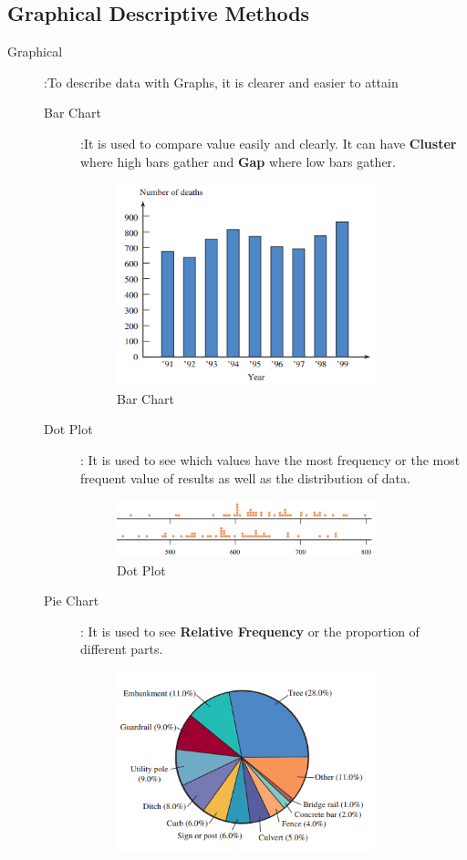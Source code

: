\subsection{Graphical Descriptive Methods}
\begin{description}
    
    \item[Graphical]:To describe data with Graphs, it is clearer and easier to attain 
    \begin{description}
        \item[Bar Chart]:It is used to compare value easily and clearly. It can have \textbf{Cluster} where high bars gather and \textbf{Gap} where low bars gather.
        \begin{figure}[H]
            \centering
            \includegraphics[width=75mm]{bar_chart.png}
            \caption{Bar Chart}
            \label{bar chart}
        \end{figure}
        \item[Dot Plot]: It is used to see which values have the most frequency or the most frequent value of results as well as the distribution of data.
        \begin{figure}[H]
            \centering
            \includegraphics[width=75mm]{dotplot.png}
            \caption{Dot Plot}
            \label{dot plot}
        \end{figure}
        \item[Pie Chart]: It is used to see \textbf{Relative Frequency} or the proportion of different parts.
        \begin{figure}[H]
            \centering
            \includegraphics[width=75mm]{pie_chart.png}

\end{figure}
\end{description}
\end{description}
